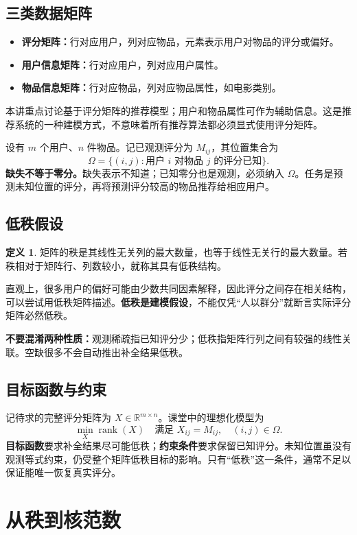 \documentclass[UTF8,fontset=fandol,a4paper,12pt]{ctexart}
\theoremstyle{definition}
\newtheorem{definition}{定义}[section]
\begin{document}
\subsection{三类数据矩阵}
\begin{itemize}
\item \textbf{评分矩阵：}行对应用户，列对应物品，元素表示用户对物品的评分或偏好。
\item \textbf{用户信息矩阵：}行对应用户，列对应用户属性。
\item \textbf{物品信息矩阵：}行对应物品，列对应物品属性，如电影类别。
\end{itemize}
本讲重点讨论基于评分矩阵的推荐模型；用户和物品属性可作为辅助信息。这是推荐系统的一种建模方式，不意味着所有推荐算法都必须显式使用评分矩阵。

设有 $m$ 个用户、$n$ 件物品。记已观测评分为 $M_{ij}$，其位置集合为
\[
\Omega=\{(i,j):\text{用户 }i\text{ 对物品 }j\text{ 的评分已知}\}.
\]
\textbf{缺失不等于零分。}缺失表示不知道；已知零分也是观测，必须纳入 $\Omega$。任务是预测未知位置的评分，再将预测评分较高的物品推荐给相应用户。

\subsection{低秩假设}
\begin{definition}
矩阵的秩是其线性无关列的最大数量，也等于线性无关行的最大数量。若秩相对于矩阵行、列数较小，就称其具有低秩结构。
\end{definition}
直观上，很多用户的偏好可能由少数共同因素解释，因此评分之间存在相关结构，可以尝试用低秩矩阵描述。\textbf{低秩是建模假设}，不能仅凭“人以群分”就断言实际评分矩阵必然低秩。

\textbf{不要混淆两种性质：}观测稀疏指已知评分少；低秩指矩阵行列之间有较强的线性关联。空缺很多不会自动推出补全结果低秩。

\subsection{目标函数与约束}
记待求的完整评分矩阵为 $X\in\mathbb{R}^{m\times n}$。课堂中的理想化模型为
\[
\boxed{\min_X\operatorname{rank}(X)\quad
\text{满足 }X_{ij}=M_{ij},\quad(i,j)\in\Omega.}
\]
\textbf{目标函数}要求补全结果尽可能低秩；\textbf{约束条件}要求保留已知评分。未知位置虽没有观测等式约束，仍受整个矩阵低秩目标的影响。只有“低秩”这一条件，通常不足以保证能唯一恢复真实评分。

\newpage
\section{从秩到核范数}
\end{document}
